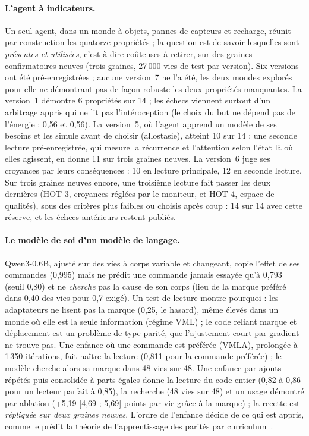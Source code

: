 \documentclass[11pt,a4paper]{article}
\begin{document}
\paragraph{L'agent à indicateurs.} Un seul agent, dans un monde à objets,
pannes de capteurs et recharge, réunit par construction les quatorze propriétés ;
la question est de savoir lesquelles sont \emph{présentes et utilisées},
c'est-à-dire coûteuses à retirer, sur des graines confirmatoires neuves (trois
graines, 27\,000 vies de test par version). Six versions ont été
pré-enregistrées ; aucune version~7 ne l'a été, les deux mondes explorés pour
elle ne démontrant pas de façon robuste les deux propriétés manquantes. La
version~1 démontre 6 propriétés sur 14 ; les échecs viennent surtout d'un
arbitrage appris qui ne lit pas l'intéroception (le choix du but ne dépend pas
de l'énergie : 0,56 et 0,56). La version~5, où l'agent apprend un modèle de ses
besoins et les simule avant de choisir (allostasie), atteint 10 sur 14 ; une
seconde lecture pré-enregistrée, qui mesure la récurrence et l'attention selon
l'état là où elles agissent, en donne 11 sur trois graines neuves. La version~6
juge ses croyances par leurs conséquences : 10 en lecture principale, 12 en
seconde lecture. Sur trois graines neuves encore, une troisième lecture fait
passer les deux dernières (HOT-3, croyances réglées par le moniteur, et HOT-4,
espace de qualités), sous des critères plus faibles ou choisis après coup :
14 sur 14 avec cette réserve, et les échecs antérieurs restent publiés.

\paragraph{Le modèle de soi d'un modèle de langage.} Qwen3-0.6B, ajusté sur des
vies à corps variable et changeant, copie l'effet de ses commandes (0,995) mais
ne prédit une commande jamais essayée qu'à 0,793 (seuil 0,80) et ne
\emph{cherche} pas la cause de son corps (lieu de la marque préféré dans 0,40 des
vies pour 0,7 exigé). Un test de lecture montre pourquoi : les adaptateurs ne
lisent pas la marque (0,25, le hasard), même élevés dans un monde où elle est la
seule information (régime VML) ; le code reliant marque et déplacement est un
problème de type parité, que l'ajustement court par gradient ne trouve pas.
Une enfance où une commande est préférée (VMLA), prolongée à 1\,350 itérations,
fait naître la lecture (0,811 pour la commande préférée) ; le modèle cherche
alors sa marque dans 48 vies sur 48. Une enfance par ajouts répétés puis
consolidée à parts égales donne la lecture du code entier (0,82 à 0,86 pour un
lecteur parfait à 0,85), la recherche (48 vies sur 48) et un usage démontré
par ablation (+5,19 [4,69 ; 5,69] points par vie grâce à la marque) ; la
recette est \emph{répliquée sur deux graines neuves}. L'ordre de l'enfance
décide de ce qui est appris, comme le prédit la théorie de l'apprentissage des
parités par curriculum~\cite{cornacchia2023,abbe2023}.
\end{document}
